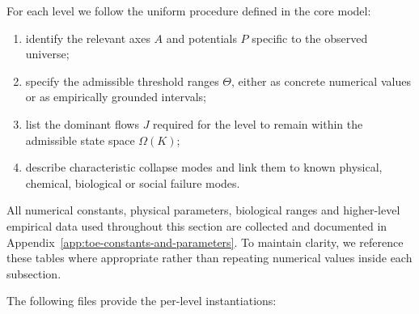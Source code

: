 For each level we follow the uniform procedure defined in the core model:
\begin{enumerate}
    \item identify the relevant axes \(A\) and potentials \(P\) specific 
          to the observed universe;
    \item specify the admissible threshold ranges \(\Theta\), either as 
          concrete numerical values or as empirically grounded intervals;
    \item list the dominant flows \(J\) required for the level to remain 
          within the admissible state space \(\Omega(K)\);
    \item describe characteristic collapse modes and link them to known 
          physical, chemical, biological or social failure modes.
\end{enumerate}

All numerical constants, physical parameters, biological ranges and 
higher-level empirical data used throughout this section are collected 
and documented in Appendix~\ref{app:toe-constants-and-parameters}. 
To maintain clarity, we reference these tables where appropriate rather 
than repeating numerical values inside each subsection.

The following files provide the per-level instantiations:














